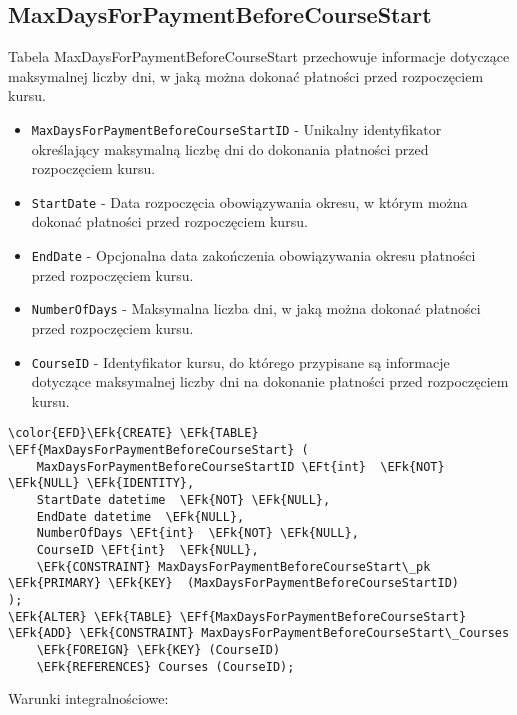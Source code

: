 \documentclass[11pt]{article}
\newcommand{\EFk}[1]{\textcolor{EFk}{\textbf{#1}}} %
\newcommand{\EFf}[1]{\textcolor{EFf}{#1}} %
\newcommand{\EFt}[1]{\textcolor{EFt}{\textbf{#1}}} %
\begin{document}
\subsection{MaxDaysForPaymentBeforeCourseStart}
\label{sec:org98aa3c9}
Tabela MaxDaysForPaymentBeforeCourseStart przechowuje informacje dotyczące maksymalnej liczby dni, w jaką można dokonać płatności przed rozpoczęciem kursu.
\begin{itemize}
\item \texttt{MaxDaysForPaymentBeforeCourseStartID} - Unikalny identyfikator określający maksymalną liczbę dni do dokonania płatności przed rozpoczęciem kursu.
\item \texttt{StartDate} - Data rozpoczęcia obowiązywania okresu, w którym można dokonać płatności przed rozpoczęciem kursu.
\item \texttt{EndDate} - Opcjonalna data zakończenia obowiązywania okresu płatności przed rozpoczęciem kursu.
\item \texttt{NumberOfDays} - Maksymalna liczba dni, w jaką można dokonać płatności przed rozpoczęciem kursu.
\item \texttt{CourseID} - Identyfikator kursu, do którego przypisane są informacje dotyczące maksymalnej liczby dni na dokonanie płatności przed rozpoczęciem kursu.
\end{itemize}
\begin{Code}
\begin{Verbatim}
\color{EFD}\EFk{CREATE} \EFk{TABLE} \EFf{MaxDaysForPaymentBeforeCourseStart} (
    MaxDaysForPaymentBeforeCourseStartID \EFt{int}  \EFk{NOT} \EFk{NULL} \EFk{IDENTITY},
    StartDate datetime  \EFk{NOT} \EFk{NULL},
    EndDate datetime  \EFk{NULL},
    NumberOfDays \EFt{int}  \EFk{NOT} \EFk{NULL},
    CourseID \EFt{int}  \EFk{NULL},
    \EFk{CONSTRAINT} MaxDaysForPaymentBeforeCourseStart\_pk \EFk{PRIMARY} \EFk{KEY}  (MaxDaysForPaymentBeforeCourseStartID)
);
\EFk{ALTER} \EFk{TABLE} \EFf{MaxDaysForPaymentBeforeCourseStart} \EFk{ADD} \EFk{CONSTRAINT} MaxDaysForPaymentBeforeCourseStart\_Courses
    \EFk{FOREIGN} \EFk{KEY} (CourseID)
    \EFk{REFERENCES} Courses (CourseID);
\end{Verbatim}
\end{Code}
Warunki integralnościowe:
\end{document}
